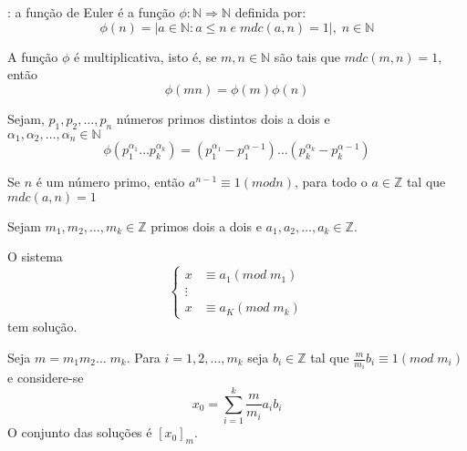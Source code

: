 \begin{definicao}: a função de Euler é a função $\phi : \mathbb{N} \Rightarrow \mathbb{N}$ definida por:$$\phi ( n)=|{a \in \mathbb{N}:a \leq n\;e \;mdc(a,n)=1}|,\;n\in \mathbb{N}$$
\end{definicao}

\begin{teorema}
\label{teo:teoremaA}
 A função $\phi$ é multiplicativa, isto é, se $m,n \in \mathbb{N}$ são tais que $mdc(m,n)=1$, então $$\phi(mn)=\phi(m) \phi(n)$$
 \end{teorema}
 
\begin{teorema}    
 Sejam, $p_1,p_2,\dotsc ,p_n$ números primos distintos dois a dois e\\ $\alpha_1,\alpha_2,\dotsc,\alpha_n \in \mathbb{N}$
$$\phi(p_1^{\alpha_1} \dotsc p_k^{\alpha_k} )=(p_1^{\alpha_1} -p_1^{\alpha-1} )\dotsc (p_k^{\alpha_k} -p_k^{\alpha-1} )$$
\end{teorema}
\begin{teorema}
\label{teo:PequenoTeoremaFermat}
Se $n$ é um número primo, então $a^{n-1} \equiv 1(mod n)$, para todo o $a \in \mathbb{Z}$ tal que $mdc(a,n)=1$
\end{teorema}
\begin{teorema}
\label{teo:TeoremaChinesDosRestos}
Sejam $m_1,m_2,\dotsc,m_k \in \mathbb{Z}$ primos dois a dois e $a_1,a_2,\dotsc,a_k \in \mathbb{Z}$.

O sistema 
\begin{equation}
\left\{ \begin{aligned} 
  x &\equiv a_1 (mod \;m_1)\\
  \vdots\\
  x &\equiv a_K (mod\; m_k)
\end{aligned} \right.
\end{equation}
tem solução.
\end{teorema}
Seja $m=m_1m_2\dotsc \; m_k.$ Para $i=1,2,\dotsc,m_k$ seja $b_i \in \mathbb{Z}$ tal que $\frac{m}{m_i}b_i\equiv 1(mod\; m_i)$ e considere-se 
$$x_0=\sum_{i=1}^k \frac{m}{m_i}a_ib_i$$
O conjunto das soluções é $[x_0]_m$.

